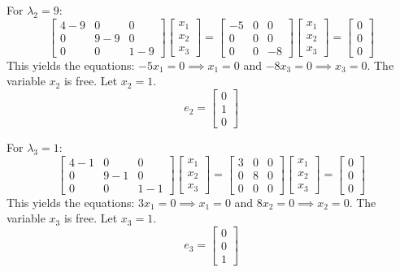 \documentclass{article}
\begin{document}
For $\lambda_2 = 9$:
\[
\begin{bmatrix} 4-9 & 0 & 0 \\ 0 & 9-9 & 0 \\ 0 & 0 & 1-9 \end{bmatrix} \begin{bmatrix} x_1 \\ x_2 \\ x_3 \end{bmatrix} = \begin{bmatrix} -5 & 0 & 0 \\ 0 & 0 & 0 \\ 0 & 0 & -8 \end{bmatrix} \begin{bmatrix} x_1 \\ x_2 \\ x_3 \end{bmatrix} = \begin{bmatrix} 0 \\ 0 \\ 0 \end{bmatrix}
\]
This yields the equations: $-5x_1 = 0 \implies x_1 = 0$ and $-8x_3 = 0 \implies x_3 = 0$. The variable $x_2$ is free. Let $x_2 = 1$.
\[
e_2 = \begin{bmatrix} 0 \\ 1 \\ 0 \end{bmatrix}
\]

For $\lambda_3 = 1$:
\[
\begin{bmatrix} 4-1 & 0 & 0 \\ 0 & 9-1 & 0 \\ 0 & 0 & 1-1 \end{bmatrix} \begin{bmatrix} x_1 \\ x_2 \\ x_3 \end{bmatrix} = \begin{bmatrix} 3 & 0 & 0 \\ 0 & 8 & 0 \\ 0 & 0 & 0 \end{bmatrix} \begin{bmatrix} x_1 \\ x_2 \\ x_3 \end{bmatrix} = \begin{bmatrix} 0 \\ 0 \\ 0 \end{bmatrix}
\]
This yields the equations: $3x_1 = 0 \implies x_1 = 0$ and $8x_2 = 0 \implies x_2 = 0$. The variable $x_3$ is free. Let $x_3 = 1$.
\[
e_3 = \begin{bmatrix} 0 \\ 0 \\ 1 \end{bmatrix}
\]
\end{document}
